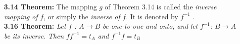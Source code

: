 \documentclass{article}
\begin{document}
    \textbf{3.14 Theorem:} The mapping $g$ of Theorem 3.14 is called the \textit{inverse \\
    mapping of $f$,} or simply the \textit{inverse of $f$}. It is denoted by $f^{-1}$ . \\
     
    \textbf{3.16 Theorem:} \textit{ Let $f$ : $A \rightarrow B$ be one-to-one and onto, and let $f^{-1}$: $B \rightarrow A$ \\ be its inverse. Then $ff^{-1} = t_{A}$ and $f^{-1}f = t_{B}$}
    
\end{document}
